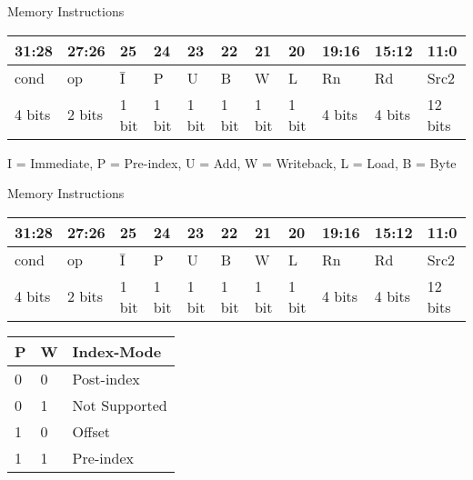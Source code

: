 \documentclass[aspectratio=169]{beamer}
\begin{document}
\begin{frame}{Memory Instructions}
    \begin{center}
        \renewcommand{\arraystretch}{1.5}
        \begin{tabular}{|p{3.0em}|p{3.0em}|p{1.5em}|p{1.5em}|p{1.5em}|p{1.5em}|p{1.5em}|p{1.5em}|p{3.0em}|p{3.0em}|p{3.0em}|}
        \hline
        31:28 & 27:26 & 25 & 24 & 23 & 22 & 21 & 20 & 19:16 & 15:12 & 11:0\\
        \hline
        cond & op & \=I & P & U & B & W & L & Rn & Rd & Src2\\
        \hline
        4 bits & 2 bits & 1 bit & 1 bit & 1 bit & 1 bit &  1 bit & 1 bit & 4 bits & 4 bits & 12 bits\\
        \hline
        \end{tabular}
    
        \vspace{0.5cm}
    
        I = Immediate, P = Pre-index, U = Add, W = Writeback, L = Load, B = Byte
    \end{center}
    \end{frame}

    \begin{frame}{Memory Instructions}
        \begin{center}
            \renewcommand{\arraystretch}{1.2}
            \begin{tabular}{|p{3.0em}|p{3.0em}|p{1.5em}|p{1.5em}|p{1.5em}|p{1.5em}|p{1.5em}|p{1.5em}|p{3.0em}|p{3.0em}|p{3.0em}|}
            \hline
            31:28 & 27:26 & 25 & 24 & 23 & 22 & 21 & 20 & 19:16 & 15:12 & 11:0\\
            \hline
            cond & op & \=I & P & U & B & W & L & Rn & Rd & Src2\\
            \hline
            4 bits & 2 bits & 1 bit & 1 bit & 1 bit & 1 bit &  1 bit & 1 bit & 4 bits & 4 bits & 12 bits\\
            \hline
            \end{tabular}
            \vspace{0.5cm}
        
            \begin{tabular}{|p{3.0em}|p{3.0em}|p{8.0em}|}
                \hline
                P & W & Index-Mode \\ \hline
                0 & 0 & Post-index \\ \hline
                0 & 1 & Not Supported \\ \hline
                1 & 0 & Offset \\ \hline
                1 & 1 & Pre-index \\ \hline
            \end{tabular}
            
        \end{center}
    \end{frame}
\end{document}
